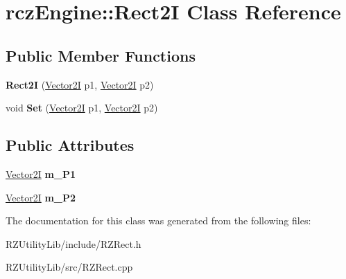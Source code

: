 \hypertarget{classrcz_engine_1_1_rect2_i}{}\section{rcz\+Engine\+:\+:Rect2\+I Class Reference}
\label{classrcz_engine_1_1_rect2_i}
\subsection*{Public Member Functions}
\begin{DoxyCompactItemize}
\item 
\hypertarget{classrcz_engine_1_1_rect2_i_a15e8b5ad341bef50845bedc5f49af156}{}{\bfseries Rect2\+I} (\hyperlink{classrcz_engine_1_1_vector2_i}{Vector2\+I} p1, \hyperlink{classrcz_engine_1_1_vector2_i}{Vector2\+I} p2)\label{classrcz_engine_1_1_rect2_i_a15e8b5ad341bef50845bedc5f49af156}

\item 
\hypertarget{classrcz_engine_1_1_rect2_i_a453235c24e250cf475bd576a7b4aae16}{}void {\bfseries Set} (\hyperlink{classrcz_engine_1_1_vector2_i}{Vector2\+I} p1, \hyperlink{classrcz_engine_1_1_vector2_i}{Vector2\+I} p2)\label{classrcz_engine_1_1_rect2_i_a453235c24e250cf475bd576a7b4aae16}

\end{DoxyCompactItemize}
\subsection*{Public Attributes}
\begin{DoxyCompactItemize}
\item 
\hypertarget{classrcz_engine_1_1_rect2_i_acb39e0b7fed443fbe000e4ecccac632f}{}\hyperlink{classrcz_engine_1_1_vector2_i}{Vector2\+I} {\bfseries m\+\_\+\+P1}\label{classrcz_engine_1_1_rect2_i_acb39e0b7fed443fbe000e4ecccac632f}

\item 
\hypertarget{classrcz_engine_1_1_rect2_i_ad5a7277a53581a7a0333059e216ae74c}{}\hyperlink{classrcz_engine_1_1_vector2_i}{Vector2\+I} {\bfseries m\+\_\+\+P2}\label{classrcz_engine_1_1_rect2_i_ad5a7277a53581a7a0333059e216ae74c}

\end{DoxyCompactItemize}


The documentation for this class was generated from the following files\+:\begin{DoxyCompactItemize}
\item 
R\+Z\+Utility\+Lib/include/R\+Z\+Rect.\+h\item 
R\+Z\+Utility\+Lib/src/R\+Z\+Rect.\+cpp\end{DoxyCompactItemize}
